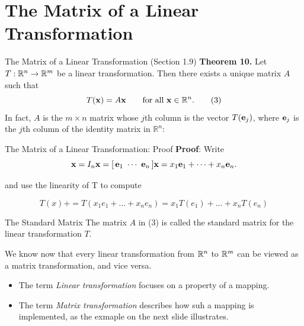 \section[Matrix of $T$]{The Matrix of a Linear Transformation}
\begin{frame}{The Matrix of a Linear Transformation (Section 1.9)}
\textcolor{lectureblue}{\bfseries Theorem 10.}
Let $T:\mathbb{R}^n\to\mathbb{R}^m$ be a linear transformation. Then there exists a unique
matrix $A$ such that
\[
T(\mathbf{x})=A\mathbf{x} \qquad\text{for all }\mathbf{x}\in\mathbb{R}^n. \tag{3}
\]
In fact, $A$ is the $m\times n$ matrix whose $j$th column is
the vector $T(\mathbf{e}_j)$, where $\mathbf{e}_j$ is the $j$th column of the identity matrix in $\mathbb{R}^n$:
\end{frame}

\begin{frame}{The Matrix of a Linear Transformation: Proof}
\textbf{Proof}: Write
\[
\mathbf{x}=I_n\mathbf{x}=[\,\mathbf{e}_1\ \cdots\ \mathbf{e}_n\,]\mathbf{x}
=x_1\mathbf{e}_1+\cdots+x_n\mathbf{e}_n.
\]

and use the linearity of T to compute

\[
  T(x)+ = T(x_1e_1 + \dots + x_ne_n) = x_1T(e_1) + \dots + x_nT(e_n)
\]

\end{frame}

\begin{frame}{The Standard Matrix}
The matrix $A$ in (3) is called the \alert{standard matrix for the linear
transformation $T$}.
\medskip

We know now that every linear transformation from $\mathbb{R}^n$ to $\mathbb{R}^m$ can be viewed as a matrix
transformation, and vice versa.
\begin{itemize}
\item The term \emph{Linear transformation} focuses on a property of a mapping.
\item The term \emph{Matrix transformation} describes how suh a mapping is implemented, as the exmaple on the next slide illustrates.
\end{itemize}
\end{frame}

